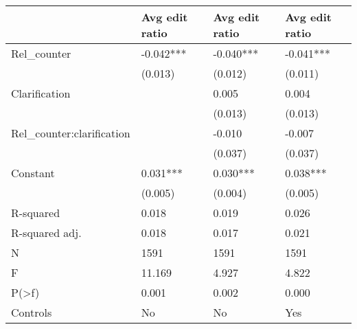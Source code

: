 \begin{tabular}{llll}
\toprule
{} & Avg edit ratio & Avg edit ratio & Avg edit ratio \\
\midrule
Rel\_counter               &      -0.042*** &      -0.040*** &      -0.041*** \\
                          &        (0.013) &        (0.012) &        (0.011) \\
Clarification             &                &          0.005 &          0.004 \\
                          &                &        (0.013) &        (0.013) \\
Rel\_counter:clarification &                &         -0.010 &         -0.007 \\
                          &                &        (0.037) &        (0.037) \\
Constant                  &       0.031*** &       0.030*** &       0.038*** \\
                          &        (0.005) &        (0.004) &        (0.005) \\
R-squared                 &          0.018 &          0.019 &          0.026 \\
R-squared adj.            &          0.018 &          0.017 &          0.021 \\
N                         &           1591 &           1591 &           1591 \\
F                         &         11.169 &          4.927 &          4.822 \\
P(>f)                     &          0.001 &          0.002 &          0.000 \\
Controls                  &             No &             No &            Yes \\
\bottomrule
\end{tabular}
